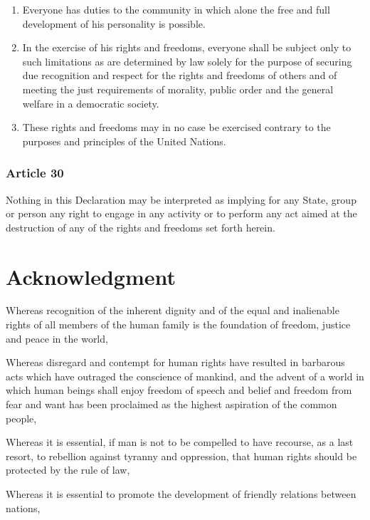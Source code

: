 \documentclass[
  titlepage,
  openright,
  DIV=calc,
  toc=listof,
  listof=nochaptergap]{scrbook}
\begin{document}
\begin{enumerate}
\def\labelenumi{\arabic{enumi}.}
\item
  Everyone has duties to the community in which alone the free and full
  development of his personality is possible.
\item
  In the exercise of his rights and freedoms, everyone shall be subject
  only to such limitations as are determined by law solely for the
  purpose of securing due recognition and respect for the rights and
  freedoms of others and of meeting the just requirements of morality,
  public order and the general welfare in a democratic society.
\item
  These rights and freedoms may in no case be exercised contrary to the
  purposes and principles of the United Nations.
\end{enumerate}

\subsection{Article 30}\label{article-30-4}

Nothing in this Declaration may be interpreted as implying for any
State, group or person any right to engage in any activity or to perform
any act aimed at the destruction of any of the rights and freedoms set
forth herein.

\chapter{Acknowledgment}\label{sec:acknowledgment}

Whereas recognition of the inherent dignity and of the equal and
inalienable rights of all members of the human family is the foundation
of freedom, justice and peace in the world,

Whereas disregard and contempt for human rights have resulted in
barbarous acts which have outraged the conscience of mankind, and the
advent of a world in which human beings shall enjoy freedom of speech
and belief and freedom from fear and want has been proclaimed as the
highest aspiration of the common people,

Whereas it is essential, if man is not to be compelled to have recourse,
as a last resort, to rebellion against tyranny and oppression, that
human rights should be protected by the rule of law,

Whereas it is essential to promote the development of friendly relations
between nations,
\end{document}
